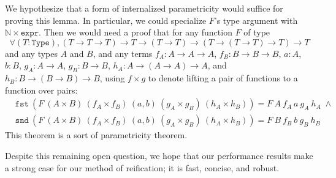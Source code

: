 We hypothesize that a form of internalized parametricity would suffice for proving this lemma.
In particular, we could specialize $F$'s type argument with $\mathbb N \times \texttt{expr}$.
Then we would need a proof that for any function $F$ of type
\[
\forall (T : \texttt{Type}), (T \to T \to T) \to T \to (T \to T) \to (T \to (T \to T) \to T) \to T
\]
and any types $A$ and $B$, and any terms $f_A : A \to A \to A$, $f_B : B \to B\to B$, $a : A$, $b : B$, $g_A : A \to A$, $g_B : B \to B$, $h_A : A \to (A \to A) \to A$, and $h_B : B \to (B \to B) \to B$, using $f\times g$ to denote lifting a pair of functions to a function over pairs:
\begin{align*}
  & \texttt{fst}\ \left(F\ (A \times B)\ (f_A \times f_B)\ (a, b)\ (g_A \times g_B)\ (h_A \times h_B)\right) = F\ A\ f_A\ a\ g_A\ h_A \;\wedge \\
  & \texttt{snd}\ \left(F\ (A \times B)\ (f_A \times f_B)\ (a, b)\ (g_A \times g_B)\ (h_A \times h_B)\right) = F\ B\ f_B\ b\ g_B\ h_B
\end{align*}
This theorem is a sort of parametricity theorem.

Despite this remaining open question, we hope that our performance results make a strong case for our method of reification; it is fast, concise, and robust.
